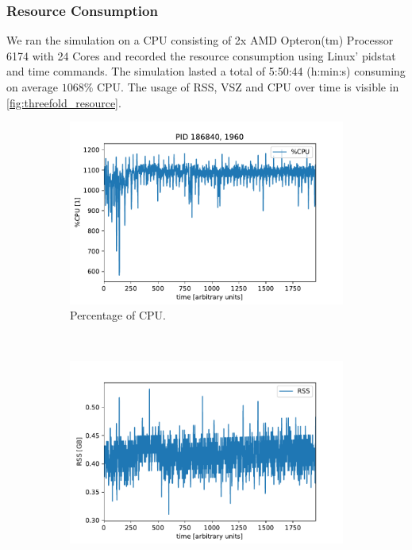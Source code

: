 \documentclass[11pt, a4paper, oneside]{article}
\begin{document}
\subsubsection{Resource Consumption}
We ran the simulation on a CPU consisting of 2x AMD Opteron(tm) Processor 6174 with 24 Cores and recorded the resource consumption using Linux' pidstat and time commands. The simulation lasted a total of 5:50:44 (h:min:s) consuming on average $1068 \%$ CPU. The usage of RSS, VSZ and CPU over time is visible in \cref{fig:threefold_resource}.
\begin{figure}[h!]
  \begin{subfigure}[b]{0.5 \textwidth}
    \includegraphics[width = \textwidth]{graphics/threefold_morse/threefold_perCPU.pdf}
    \caption{Percentage of CPU.}
  \end{subfigure}
  ~
  \begin{subfigure}[b]{0.5 \textwidth}
    \includegraphics[width = \textwidth]{graphics/threefold_morse/threefold_RSS.pdf}

\end{subfigure}
\end{figure}
\end{document}
